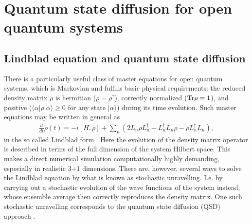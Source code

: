 \documentclass[prd,11pt, amsmath, amsymb, aps, reprint, tightenlines, nofootinbib, longbibliography, abbrv, preprintnumbers]{revtex4-1}
\begin{document}
\section{Quantum state diffusion for open quantum systems}
\label{sec:QSD}
\subsection{Lindblad equation and quantum state diffusion}
There is a particularly useful class of master equations for open quantum systems, which is Markovian and fulfills basic physical requirements: the reduced density matrix $\rho$ is hermitian ($\rho = \rho^{\dagger}$), correctly normalized (${\rm Tr}\rho = 1$), and positive ($\langle\alpha|\rho|\alpha\rangle\geq 0$ for any state $|\alpha\rangle$) during its time evolution.
Such master equations may be written in general as
\begin{align}
\label{eq:Lindblad}
\frac{d}{dt}\rho(t) = -i\left[H,\rho\right]
+\sum_n\left(
2L_n\rho L_n^{\dagger} - L_n^{\dagger}L_n\rho - \rho L_n^{\dagger} L_n
\right),
\end{align}
in the so called Lindblad form \cite{lindblad1976generators}.
Here the evolution of the density matrix operator is described in terms of the full dimension of the system Hilbert space.
This makes a direct numerical simulation computationally highly demanding, especially in realistic 3+1 dimensions.
There are, however, several ways to solve the Lindblad equation by what is known as stochastic unravelling.
I.e. by carrying out a stochastic evolution of the wave functions of the system instead, whose ensemble average then correctly reproduces the density matrix.
One such stochastic unravelling corresponds to the quantum state diffusion (QSD) approach \cite{gisin1992quantum}.
\end{document}
